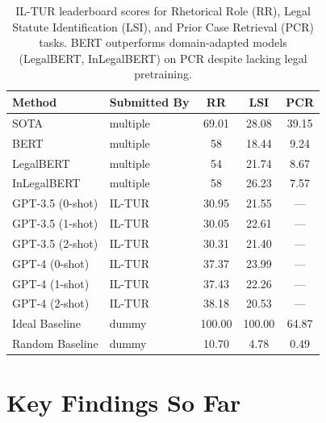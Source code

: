 \documentclass[11pt]{article}
\begin{document}
\begin{table}[htbp]
\centering
\small
\begin{tabular}{@{}llccc@{}}
\toprule
\textbf{Method} & \textbf{Submitted By} & \textbf{RR} & \textbf{LSI} & \textbf{PCR} \\
\midrule
SOTA             & multiple & 69.01 & 28.08 & 39.15 \\
BERT             & multiple & 58    & 18.44 & 9.24  \\
LegalBERT        & multiple & 54    & 21.74 & 8.67  \\
InLegalBERT      & multiple & 58    & 26.23 & 7.57  \\
\midrule
GPT-3.5 (0-shot) & IL-TUR   & 30.95 & 21.55 & ---   \\
GPT-3.5 (1-shot) & IL-TUR   & 30.05 & 22.61 & ---   \\
GPT-3.5 (2-shot) & IL-TUR   & 30.31 & 21.40 & ---   \\
GPT-4 (0-shot)   & IL-TUR   & 37.37 & 23.99 & ---   \\
GPT-4 (1-shot)   & IL-TUR   & 37.43 & 22.26 & ---   \\
GPT-4 (2-shot)   & IL-TUR   & 38.18 & 20.53 & ---   \\
\midrule
Ideal Baseline   & dummy    & 100.00 & 100.00 & 64.87 \\
Random Baseline  & dummy    & 10.70  & 4.78   & 0.49  \\
\bottomrule
\end{tabular}
\caption{IL-TUR leaderboard scores for Rhetorical Role (RR), Legal Statute Identification (LSI), and Prior Case Retrieval (PCR) tasks. BERT outperforms domain-adapted models (LegalBERT, InLegalBERT) on PCR despite lacking legal pretraining.}
\label{tab:iltur}
\end{table}

\section{Key Findings So Far}
\end{document}
